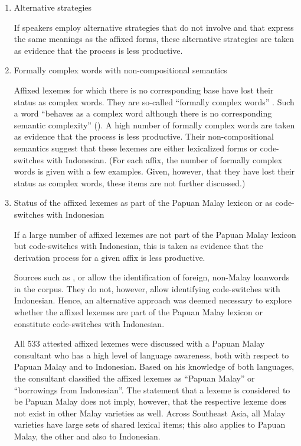 \begin{enumerate}
\begin{enumerate}
\item 
Alternative strategies


If speakers employ alternative strategies that do not involve  and that express the same meanings as the affixed forms, these alternative strategies are taken as evidence that the  process is less productive.



\item 
Formally complex words with non-compositional semantics


Affixed lexemes for which there is no corresponding base have lost their status as complex words. They are so-called “formally complex words” \citep[17]{Booij.2007}. Such a word “behaves as a complex word although there is no corresponding semantic complexity” (\citeyear*[13]{Booij.2007}). A high number of formally complex words are taken as evidence that the  process is less productive. Their non-compositional semantics suggest that these lexemes are either lexicalized forms or code-switches with Indonesian. (For each affix, the number of formally complex words is given with a few examples. Given, however, that they have lost their status as complex words, these items are not further discussed.)



\item 
Status of the affixed lexemes as part of the Papuan Malay lexicon or as code-switches with Indonesian\label{List_3.1.f}


If a large number of affixed lexemes are not part of the Papuan Malay lexicon but code-switches with Indonesian, this is taken as evidence that the derivation process for a given affix is less productive.



Sources such as \citet{Jones.2007}, or \citet{Tadmor.2009} allow the identification of foreign, non-Malay loanwords in the corpus. They do not, however, allow identifying code-switches with Indonesian. Hence, an alternative approach was deemed necessary to explore whether the affixed lexemes are part of the Papuan Malay lexicon or constitute code-switches with Indonesian.



All 533 attested affixed lexemes were discussed with a Papuan Malay consultant who has a high level of language awareness, both with respect to Papuan Malay and to Indonesian. Based on his knowledge of both languages, the consultant classified the affixed lexemes as “Papuan Malay” or “borrowings from Indonesian”. The statement that a lexeme is considered to be Papuan Malay does not imply, however, that the respective lexeme does not exist in other Malay varieties as well. Across Southeast Asia, all Malay varieties have large sets of shared lexical items; this also applies to Papuan Malay, the other  and also to Indonesian.




\end{enumerate}
\end{enumerate}
